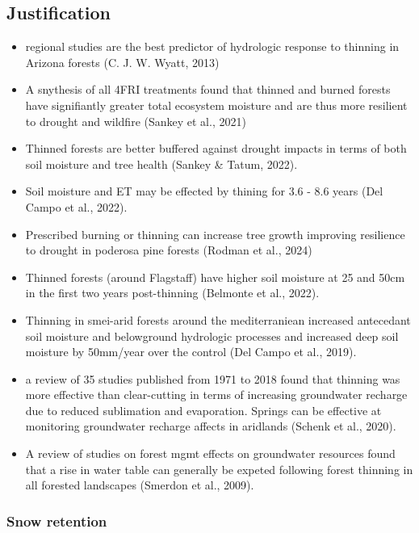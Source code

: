 \documentclass[
]{agujournal2019}
\begin{document}
\subsection{Justification}\label{justification}

\begin{itemize}
\item
  regional studies are the best predictor of hydrologic response to
  thinning in Arizona forests (C. J. W. Wyatt, 2013)
\item
  A snythesis of all 4FRI treatments found that thinned and burned
  forests have signifiantly greater total ecosystem moisture and are
  thus more resilient to drought and wildfire (Sankey et al., 2021)
\item
  Thinned forests are better buffered against drought impacts in terms
  of both soil moisture and tree health (Sankey \& Tatum, 2022).
\item
  Soil moisture and ET may be effected by thining for 3.6 - 8.6 years
  (Del Campo et al., 2022).
\item
  Prescribed burning or thinning can increase tree growth improving
  resilience to drought in poderosa pine forests (Rodman et al., 2024)
\item
  Thinned forests (around Flagstaff) have higher soil moisture at 25 and
  50cm in the first two years post-thinning (Belmonte et al., 2022).
\item
  Thinning in smei-arid forests around the mediterraniean increased
  antecedant soil moisture and belowground hydrologic processes and
  increased deep soil moisture by 50mm/year over the control (Del Campo
  et al., 2019).
\item
  a review of 35 studies published from 1971 to 2018 found that thinning
  was more effective than clear-cutting in terms of increasing
  groundwater recharge due to reduced sublimation and evaporation.
  Springs can be effective at monitoring groundwater recharge affects in
  aridlands (Schenk et al., 2020).
\item
  A review of studies on forest mgmt effects on groundwater resources
  found that a rise in water table can generally be expeted following
  forest thinning in all forested landscapes (Smerdon et al., 2009).
\end{itemize}

\subsubsection{Snow retention}\label{snow-retention}
\end{document}
